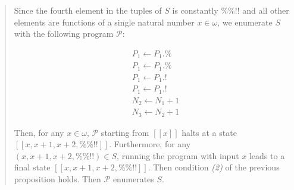 \documentclass[a4paper, 12pt]{article}
\begin{document}
\small
\begin{quote}

Since the fourth element in the tuples of $S$ is constantly $\%\% ! !$ and all
other elements are functions of a single natural number $x \in \omega$, we
enumerate $S$ with the following program $\mathcal{P}$:

\begin{align*}
    &P_1 \leftarrow P_1.\% \\ 
    &P_1 \leftarrow P_1.\% \\
    &P_1 \leftarrow P_1.! \\
    &P_1 \leftarrow P_1.!\\
    &N_2 \leftarrow N_1 + 1 \\ 
    &N_3 \leftarrow N_2 + 1
\end{align*}

Then, for any $x \in  \omega$, $\mathcal{P}$ starting from $[\![ x ]\!]$ halts
at a state $[\![ x, x+1, x+2, \%\%!! ]\!]$. Furthermore, for any $(x, x+1, x+2,
\%\%!!) \in S$, running the program with input $x$ leads to a final state $[\![
x, x+1, x+2, \%\%!!]\!]$. Then condition \textit{(2)} of the previous
proposition holds. Then $\mathcal{P}$ enumerates $S$.


\end{quote}
\normalsize
\end{document}
